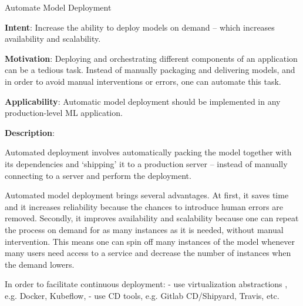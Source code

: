   
  \begin{frame}[plain]{ Automate Model Deployment
 }

  \textbf{Intent}: Increase the ability to deploy models on demand -- which increases availability and scalability. 
 

  \textbf{Motivation}: Deploying and orchestrating different components of an application can be a tedious task. Instead of manually packaging and delivering models, and in order to avoid manual interventions or errors, one can automate this task. 
 

  \textbf{Applicability}: Automatic model deployment should be implemented in any production-level ML application.
 

  \textbf{Description}: 

Automated deployment involves automatically packing the model together with its dependencies and `shipping' it to a production server -- instead of manually connecting to a server and perform the deployment.


Automated model deployment brings several advantages. At first, it saves time and it increases reliability because the chances to introduce human errors are removed.
Secondly, it improves availability and scalability because one can repeat the process on demand for as many instances as it is needed, without manual intervention.
This means one can spin off many instances of the model whenever many users need access to a service and decrease the number of instances when the demand lowers.


In order to facilitate continuous deployment:
- use virtualization abstractions , e.g. Docker, Kubeflow,
- use CD tools, e.g. Gitlab CD/Shipyard, Travis, etc.


 


  \end{frame}

